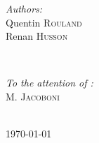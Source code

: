 \documentclass[12pt]{article}
\begin{document}
\begin{minipage}{0.4\textwidth}
\begin{flushleft} \large
\emph{Authors:}\\
Quentin \textsc{Rouland}\\
Renan \textsc{Husson}
\end{flushleft}
\end{minipage}
~
\begin{minipage}{0.4\textwidth}
\begin{flushright} \large
\emph{To the attention of :} \\
 M.  \textsc{Jacoboni }
\end{flushright}
\end{minipage}\\[4cm]



{\large \today}\\[3cm] %
\end{document}
